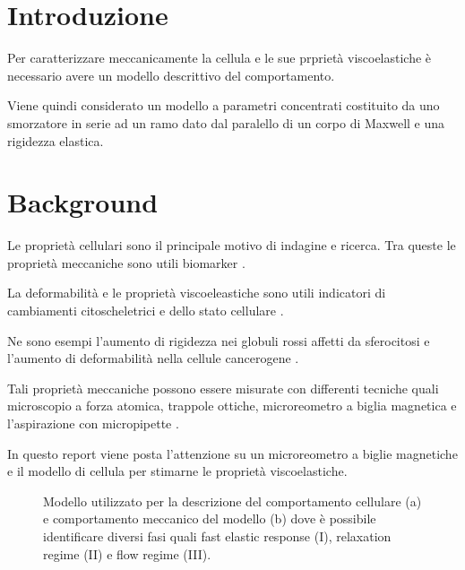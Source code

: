 \section{Introduzione}

Per caratterizzare meccanicamente la cellula e le sue prprietà viscoelastiche è necessario avere un modello descrittivo del comportamento.

Viene quindi considerato un modello a parametri concentrati costituito da uno smorzatore in serie ad un ramo dato dal paralello di un corpo di Maxwell e una rigidezza elastica.



\section{Background}

Le proprietà cellulari sono il principale motivo di indagine e ricerca. Tra queste le proprietà meccaniche sono utili biomarker \cite{di_carlo_mechanical_2012}. 

La deformabilità e le proprietà viscoeleastiche sono utili indicatori di cambiamenti citoscheletrici e dello stato cellulare .  

Ne sono esempi l'aumento di rigidezza nei globuli rossi affetti da sferocitosi \cite{lee_biomechanics_2007,suresh_connections_2005} e l'aumento di deformabilità nella cellule cancerogene \cite{mierke_viscoelasticity_2021}.

Tali proprietà meccaniche possono essere misurate con differenti tecniche quali microscopio a forza atomica, trappole ottiche, microreometro a biglia magnetica e l'aspirazione con micropipette \cite{ethier_introductory_nodate}.

In questo report viene posta l'attenzione su un microreometro a biglie magnetiche e il modello di cellula per stimarne le proprietà viscoelastiche.


\begin{figure}[t!]
	\begin{subfigure}{0.5\linewidth}
		\centering
		\footnotesize{
			\def\svgwidth{0.9\linewidth}
			}
		\caption{}
		\label{fig:mechanical}
	\end{subfigure}\hfill
	\begin{subfigure}{0.5\linewidth}
		\centering
		\footnotesize{
			\def\svgwidth{0.9\linewidth}
			}
		\caption{}
		\label{fig:mechanical1}
	\end{subfigure}\hfill
	\caption{Modello utilizzato per la descrizione del comportamento cellulare (a) e comportamento meccanico del modello (b) dove è possibile identificare diversi fasi quali fast elastic response (I), relaxation regime (II) e flow regime (III).}
\end{figure}
\begin{figure}[b!]
	\centering
	\footnotesize{
	 \def\svgwidth{\linewidth}
	 }
	\caption{}
	\label{fig:system}
\end{figure}



